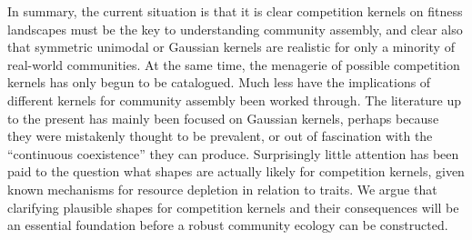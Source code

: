 \documentclass[a4paper,11pt]{article}
\begin{document}
In summary, the current situation is that it is clear competition kernels on fitness landscapes must be the key to understanding community assembly, and clear also that symmetric unimodal or Gaussian kernels are realistic for only a minority of real-world communities. At the same time, the menagerie of possible competition kernels has only begun to be catalogued. Much less have the implications of different kernels for community assembly been worked through. The literature up to the present has mainly been focused on Gaussian kernels, perhaps because they were mistakenly thought to be prevalent, or out of fascination with the ``continuous coexistence'' they can produce. Surprisingly little attention has been paid to the question what shapes are actually likely for competition kernels, given known mechanisms for resource depletion in relation to traits. We argue that clarifying plausible shapes for competition kernels and their consequences will be an essential foundation before a robust community ecology can be constructed.
\end{document}
